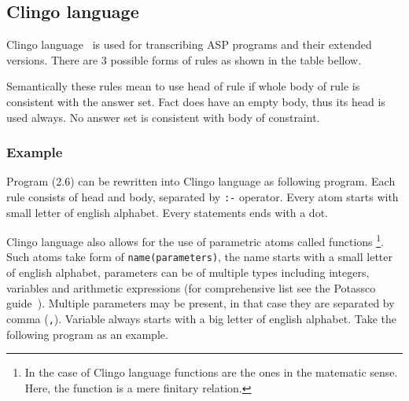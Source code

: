 \documentclass[
    digital,
    color,
    oneside,
    sansbold,
    lot,
    nolof
]{fithesis}
\begin{document}
\subsection{Clingo language}
Clingo language~\cite{gebser2019potassco} is used for transcribing ASP programs and their extended versions.
There are 3 possible forms of rules as shown in the table bellow.
{\setlength{\tabcolsep}{0.2em}%
\begin{center}
\end{center}}\noindent
Semantically these rules mean to use head of rule if whole body of rule
is consistent with the answer set. Fact does have an empty body, thus its
head is used always. No answer set is consistent with body of constraint.

\subsubsection{Example}
Program (2.6) can be rewritten into Clingo language as following
program.
Each rule consists of head and body, separated by \texttt{:-} operator.
Every atom starts with small letter of english alphabet.
Every statements ends with a dot.

Clingo language also allows for the use of parametric atoms called functions%
\footnote{In the case of Clingo language functions are the ones
in the matematic sense. Here, the function is a mere finitary relation.}.
Such atoms take form of \texttt{name(parameters)}, the name starts with
a small letter of english alphabet, parameters can be of multiple types
including integers, variables and arithmetic expressions (for comprehensive list
see the Potassco guide~\cite{gebser2019potassco}). Multiple parameters may be
present, in that case they are separated by comma (\texttt{,}).
Variable always starts with a big letter of english alphabet.
Take the following program as an example.
\end{document}
